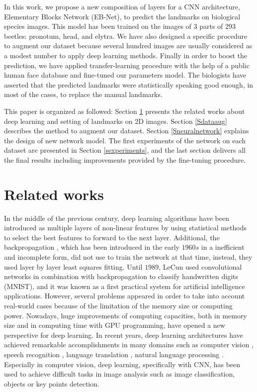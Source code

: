 \documentclass[review]{elsarticle}
\begin{document}
In this work, we propose  a new composition of layers for a CNN
architecture, Elementary Blocks Network (EB-Net), to predict the
landmarks on biological species images. This model has been 
trained on the images of $3$ parts of $293$ beetles: pronotum, head, and elytra. We have also designed a
specific procedure to augment our dataset because several hundred
images are usually considered as a modest number to apply deep
learning methods. Finally in order to boost the prediction, we have
applied transfer-learning procedure with the help of a public human
face database and fine-tuned our parameters model. The biologists have
asserted that the predicted landmarks were
statistically speaking good enough, in most of the cases, to replace the manual
landmarks. 

This paper is organized as followed: Section \ref{related_works}
presents the related works about deep learning and setting of
landmarks on 2D images. Section \ref{Sdataaug} describes the method to
augment our dataset. Section \ref{Sneuralnetwork} explains the design
of new network model. The first experiments of the network on each
dataset are presented in Section \ref{sexperiments}, and the last
section delivers all the final results including improvements provided
by the fine-tuning procedure.


\section{Related works}
\label{related_works}

In the middle of the previous century, deep learning algorithms
have been introduced as multiple layers of non-linear features by using statistical methods to select the best features to forward to the next layer. Additional, the backpropagation \cite{lecun1989backpropagation}, which has been introduced in the early $1960s$ in a inefficient and incomplete form, did not use to train the network at that time, instead, they used layer by layer least squares fitting. Until $1989$, LeCun \cite{lecun1998gradient} used convolutional networks in combination with backpropagation to classify handwritten digits (MNIST), and it was known as a first practical system for artificial
intelligence applications. However, several problems  appeared in
order to take into account real-world cases because of the limitation
of the memory size or computing power. Nowadays, huge improvements of
computing capacities, both in memory size and in computing time with
GPU programming, have opened a new perspective for deep learning. In
recent years, deep learning architectures have achieved remarkable
accomplishments in many domains such as computer vision
\cite{lecun1998gradient, krizhevsky2012imagenet,
  szegedy2015going,farabet2013learning,li2015convolutional, vu2018heritage}, speech
recognition \cite{hinton2012deep, mikolov2011strategies}, language
translation \cite{jean2014using, sutskever2014sequence}, natural
language processing \cite{lecun2015deep, collobert2011natural,
  collobert2008unified}. Especially in computer vision, deep learning,
specifically with CNN, has been used to achieve difficult tasks in
image analysis such as image classification, objects or key points
detection.
\end{document}
